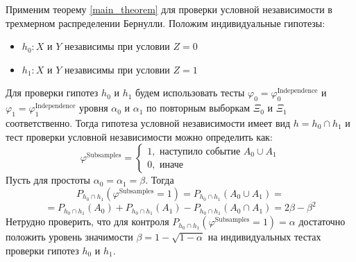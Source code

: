 Применим теорему \ref{main_theorem} для проверки условной независимости в трехмерном
распределении Бернулли.
Положим индивидуальные гипотезы:
\begin{itemize}
    \item $h_0 : X$ и $Y$ независимы при условии $Z=0$
    \item $h_1 : X$ и $Y$ независимы при условии $Z=1$
\end{itemize}
Для проверки гипотез $h_0$ и $h_1$ будем использовать тесты
$\varphi_0 = \varphi^{\text{Independence}}_0$ и 
$\varphi_1 = \varphi^{\text{Independence}}_1$ уровня $\alpha_0$ и $\alpha_1$ 
по повторным выборкам
$\Xi_0$ и $\Xi_1$ соответственно.
Тогда гипотеза
условной независимости имеет вид $h = h_0 \cap h_1$ и тест проверки условной независимости можно определить как:
$$
\varphi^{\text{Subsamples}}=\begin{cases}
    1, \text{ наступило событие $A_0 \cup A_1$}\\
    0, \text{ иначе}
\end{cases}
$$
Пусть для простоты $\alpha_0 = \alpha_1 = \beta$.
Тогда $$P_{h_0 \cap h_1}(\varphi^{\text{Subsamples}}=1)=P_{h_0 \cap h_1}(A_0 \cup A_1)=$$ 
$$ = P_{h_0 \cap h_1}(A_0) + P_{h_0 \cap h_1}(A_1) - 
P_{h_0 \cap h_1}(A_0 \cap A_1) = 2\beta - \beta^2$$
Нетрудно проверить, что для контроля $P_{h_0 \cap h_1}(\varphi^{\text{Subsamples}}=1)=\alpha$ достаточно положить
уровень значимости $\beta = 1 - \sqrt{1-\alpha}$ на индивидуальных
тестах проверки гипотез $h_0$ и $h_1$.
